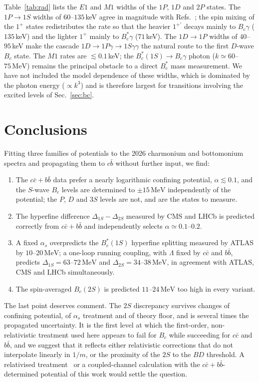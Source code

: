\documentclass[10pt,twocolumn]{article}
\newcommand{\Bc}{B_c}
\newcommand{\Bcs}{B_c^*}
\newcommand{\cc}{c\bar c}
\newcommand{\bb}{b\bar b}
\newcommand{\cb}{c\bar b}
\newcommand{\MeV}{\,\mathrm{MeV}}
\begin{document}
Table~\ref{tab:rad} lists the $E1$ and $M1$ widths of the $1P$, $1D$ and $2P$ states.
The $1P\to1S$ widths of $60$--$135\,$keV agree in magnitude with Refs.~\cite{Eichten1994,BcSpectro2026}; the spin mixing of the $1^+$ states redistributes the rate so that the heavier $1^{+\prime}$ decays mainly to $\Bc\gamma$ ($135\,$keV) and the lighter $1^+$ mainly to $\Bcs\gamma$ ($71\,$keV).
The $1D\to1P$ widths of $40$--$95\,$keV make the cascade $1D\to1P\gamma\to1S\gamma\gamma$ the natural route to the first $D$-wave $\Bc$ state.
The $M1$ rates are $\lesssim0.1\,$keV; the $\Bcs(1S)\to\Bc\gamma$ photon ($k\simeq60$--$75\MeV$) remains the principal obstacle to a direct $\Bcs$ mass measurement.
We have not included the model dependence of these widths, which is dominated by the photon energy ($\propto k^3$) and is therefore largest for transitions involving the excited levels of Sec.~\ref{sec:bc}.

\section{Conclusions}
\label{sec:conclusions}

Fitting three families of potentials to the 2026 charmonium and bottomonium spectra and propagating them to $\cb$ without further input, we find:
\begin{enumerate}
\item The $\cc+\bb$ data prefer a nearly logarithmic confining potential, $\alpha\lesssim0.1$, and the $S$-wave $\Bc$ levels are determined to $\pm15\MeV$ independently of the potential; the $P$, $D$ and $3S$ levels are not, and are the states to measure.
\item The hyperfine difference $\Delta_{1S}-\Delta_{2S}$ measured by CMS and LHCb is predicted correctly from $\cc+\bb$ and independently selects $\alpha\simeq0.1$--$0.2$.
\item A fixed $\alpha_s$ overpredicts the $\Bcs(1S)$ hyperfine splitting measured by ATLAS by $10$--$20\MeV$; a one-loop running coupling, with $\Lambda$ fixed by $\cc$ and $\bb$, predicts $\Delta_{1S}=63$--$72\MeV$ and $\Delta_{2S}=34$--$38\MeV$, in agreement with ATLAS, CMS and LHCb simultaneously.
\item The spin-averaged $\Bc(2S)$ is predicted $11$--$24\MeV$ too high in every variant.
\end{enumerate}
The last point deserves comment.
The $2S$ discrepancy survives changes of confining potential, of $\alpha_s$ treatment and of theory floor, and is several times the propagated uncertainty.
It is the first level at which the first-order, non-relativistic treatment used here appears to fail for $\Bc$ while succeeding for $\cc$ and $\bb$, and we suggest that it reflects either relativistic corrections that do not interpolate linearly in $1/m$, or the proximity of the $2S$ to the $BD$ threshold.
A relativised treatment~\cite{Godfrey2004} or a coupled-channel calculation with the $\cc+\bb$-determined potential of this work would settle the question.
\end{document}
